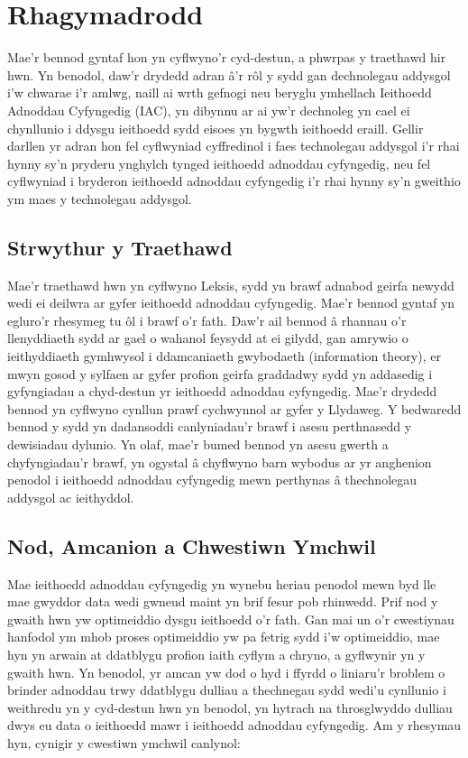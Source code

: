 \chapter{Rhagymadrodd}    
Mae'r bennod gyntaf hon yn cyflwyno'r cyd-destun, a phwrpas y traethawd hir hwn. Yn benodol, daw'r drydedd adran â'r rôl y sydd gan dechnolegau addysgol i'w chwarae i'r amlwg, naill ai wrth gefnogi neu beryglu ymhellach Ieithoedd Adnoddau Cyfyngedig (IAC), yn dibynnu ar ai yw'r dechnoleg yn cael ei chynllunio i ddysgu ieithoedd sydd eisoes yn bygwth ieithoedd eraill. Gellir darllen yr adran hon fel cyflwyniad cyffredinol i faes technolegau addysgol i'r rhai hynny sy'n pryderu ynghylch tynged ieithoedd adnoddau cyfyngedig, neu fel cyflwyniad i bryderon ieithoedd adnoddau cyfyngedig i'r rhai hynny sy'n gweithio ym maes y technolegau addysgol.

\section{Strwythur y Traethawd}
Mae'r traethawd hwn yn cyflwyno Leksis, sydd yn brawf adnabod geirfa newydd wedi ei deilwra ar gyfer ieithoedd adnoddau cyfyngedig. Mae'r bennod gyntaf yn egluro'r rhesymeg tu ôl i brawf o'r fath. Daw'r ail bennod â rhannau o'r llenyddiaeth sydd ar gael o wahanol feysydd at ei gilydd, gan amrywio o ieithyddiaeth gymhwysol i ddamcaniaeth gwybodaeth (information theory), er mwyn gosod y sylfaen ar gyfer profion geirfa graddadwy sydd yn addasedig i gyfyngiadau a chyd-destun yr ieithoedd adnoddau cyfyngedig. Mae'r drydedd bennod yn cyflwyno cynllun prawf cychwynnol ar gyfer y Llydaweg. Y bedwaredd bennod y sydd yn dadansoddi canlyniadau'r brawf i asesu perthnasedd y dewisiadau dylunio. Yn olaf, mae'r bumed bennod yn asesu gwerth a chyfyngiadau'r brawf, yn ogystal â chyflwyno barn wybodus ar yr anghenion penodol i ieithoedd adnoddau cyfyngedig mewn perthynas â thechnolegau addysgol ac ieithyddol.

\section{Nod, Amcanion a Chwestiwn Ymchwil}
Mae ieithoedd adnoddau cyfyngedig yn wynebu heriau penodol mewn byd lle mae gwyddor data wedi gwneud maint yn brif fesur pob rhinwedd. Prif nod y gwaith hwn yw optimeiddio dysgu ieithoedd o’r fath. Gan mai un o’r cwestiynau hanfodol ym mhob proses optimeiddio yw pa fetrig sydd i’w optimeiddio, mae hyn yn arwain at ddatblygu profion iaith cyflym a chryno, a gyflwynir yn y gwaith hwn. Yn benodol, yr amcan yw dod o hyd i ffyrdd o liniaru’r broblem o brinder adnoddau trwy ddatblygu dulliau a thechnegau sydd wedi’u cynllunio i weithredu yn y cyd-destun hwn yn benodol, yn hytrach na throsglwyddo dulliau dwys eu data o ieithoedd mawr i ieithoedd adnoddau cyfyngedig. Am y rhesymau hyn, cynigir y cwestiwn ymchwil canlynol:

